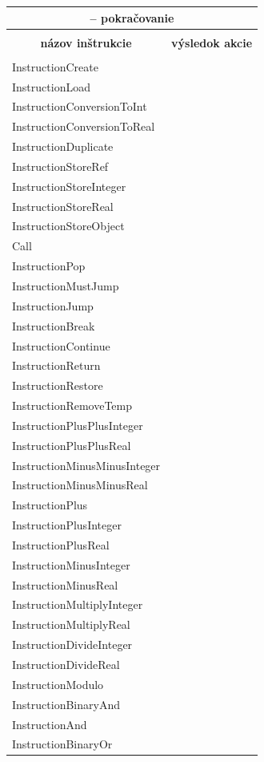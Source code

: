 \begin{center}
\begin{longtable}{|l|l|}
\multicolumn{2}{c}{{\tablename} \thetable{} -- pokračovanie} \\[0.5ex]
\hline \hline \\[-2ex]
\multicolumn{1}{c}{\textbf{názov inštrukcie}} &
\multicolumn{1}{c}{\textbf{výsledok akcie}} \\[0.5ex]\hline
\\[-1.8ex]
\endhead
InstructionCreate&\\
InstructionLoad&\\
InstructionConversionToInt&\\
InstructionConversionToReal&\\
InstructionDuplicate&\\
InstructionStoreRef&\\
InstructionStoreInteger&\\
InstructionStoreReal&\\
InstructionStoreObject&\\
Call&\\
InstructionPop&\\
InstructionMustJump&\\
InstructionJump&\\
InstructionBreak&\\
InstructionContinue&\\
InstructionReturn&\\
InstructionRestore&\\
InstructionRemoveTemp&\\
InstructionPlusPlusInteger&\\
InstructionPlusPlusReal&\\
InstructionMinusMinusInteger&\\
InstructionMinusMinusReal&\\
InstructionPlus&\\
InstructionPlusInteger&\\
InstructionPlusReal&\\
InstructionMinusInteger&\\
InstructionMinusReal&\\
InstructionMultiplyInteger&\\
InstructionMultiplyReal&\\
InstructionDivideInteger&\\
InstructionDivideReal&\\
InstructionModulo&\\
InstructionBinaryAnd&\\
InstructionAnd&\\
InstructionBinaryOr&\\

\end{longtable}
\end{center}
